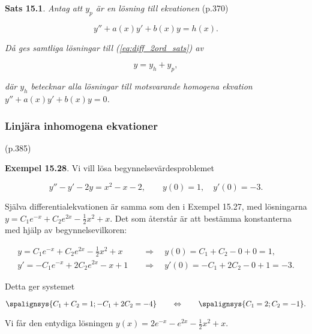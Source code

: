 \documentclass[11pt]{article}
\begin{document}
\textbf{Sats 15.1}. \textit{Antag att $y_p$ är en lösning till ekvationen} (p.370)

\begin{equation}
    y'' + a(x)y' + b(x)y = h(x).
    \label{eq:diff_2ord_sats}
\end{equation}

\textit{Då ges samtliga lösningar till (\ref{eq:diff_2ord_sats}) av}

\begin{equation}
    y = y_h + y_p,
\end{equation}

\textit{där $y_h$ betecknar alla lösningar till motsvarande homogena ekvation $y'' + a(x)y' + b(x)y = 0$.}

\newpage
\subsubsection{Linjära inhomogena ekvationer} (p.385)

\textbf{Exempel 15.28}. Vi vill lösa begynnelsevärdesproblemet

\begin{equation}
    y'' - y' - 2y = x^2 - x - 2, \qquad y(0) = 1, \quad y'(0) = -3.
\end{equation}

Själva differentialekvationen är samma som den i Exempel 15.27, med lösningarna $y = C_1e^{-x} + C_2e^{2x}-\frac{1}{2}x^2 + x$. Det som återstår är att bestämma konstanterna med hjälp av begynnelsevilkoren:

\begin{align}
    y  = C_1e^{-x} + C_2e^{2x} - \tfrac{1}{2}x^2 + x \quad &\Rightarrow \quad y(0)  = C_1 + C_2 - 0 + 0 = 1,\\
    y' = -C_1e^{-x} + 2C_2e^{2x} - x + 1             \quad &\Rightarrow \quad y'(0) = -C_1 + 2C_2 - 0 + 1 = -3.
\end{align}

Detta ger systemet

\begin{equation}
    \spalignsys{
         C_1 +  C_2 =  1;
        -C_1 + 2C_2 = -4
    }
    \qquad \Leftrightarrow \qquad
    \spalignsys{
        C_1 = 2;
        C_2 = -1
    }.
\end{equation}

Vi får den entydiga lösningen $y(x) = 2e^{-x} - e^{2x} - \tfrac{1}{2}x^2 + x$.
\end{document}
